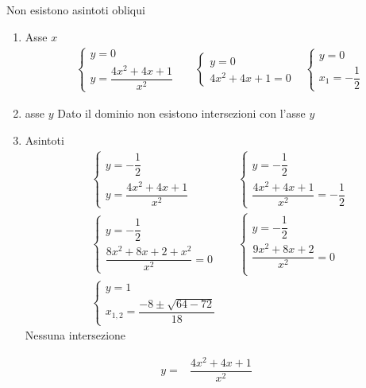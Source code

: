 \begin{exercise}
\begin{itemize}
\begin{enumerate}
		Non esistono asintoti obliqui
	\end{enumerate}
	\begin{enumerate}
		\item Asse $x$
		\begin{align*}
		&\begin{cases}
		y=0\\
		y=\dfrac{4x^2+4x+1}{x^2}
		\end{cases}
		&&\begin{cases}
		y=0\\
		4x^2+4x+1=0
		\end{cases}
		&\begin{cases}
		y=0\\
		x_1=-\dfrac{1}{2}
		\end{cases}
		\end{align*}
		\item asse $y$
	Dato il dominio non esistono intersezioni con l'asse $y$
		\item Asintoti
		\begin{align*}
			&\begin{cases}
		y=-\dfrac{1}{2}\\
		y=\dfrac{4x^2+4x+1}{x^2}
		\end{cases}
		&&\begin{cases}
		y=-\dfrac{1}{2}\\
	\dfrac{4x^2+4x+1}{x^2}=-\dfrac{1}{2}
		\end{cases}\\
		&\begin{cases}
	y=-\dfrac{1}{2}\\
	\dfrac{8x^2+8x+2+x^2}{x^2}=0
	\end{cases}
	&&\begin{cases}
	y=-\dfrac{1}{2}\\
	\dfrac{9x^2+8x+2}{x^2}=0\\
	\end{cases}\\	
	&\begin{cases}
	y=1\\
	x_{1,2}=\dfrac{-8\pm\sqrt{64-72}}{18}
	\end{cases}
\end{align*}
Nessuna intersezione
	\end{enumerate}
\begin{align*}
y=&\dfrac{4x^2+4x+1}{x^2}\\

\end{align*}
\end{itemize}
\end{exercise}
